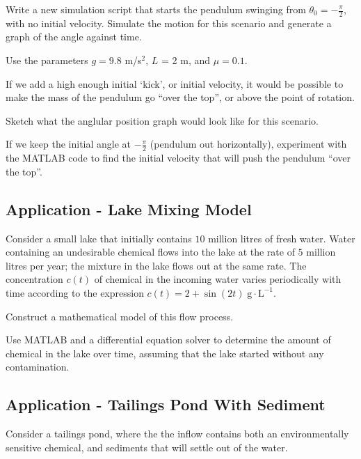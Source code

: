 \problem Write a new simulation script that starts the pendulum
swinging from $ \theta_0 = -\frac{\pi}{2}$, with no initial velocity.
Simulate the motion for this scenario and generate a graph of the
angle against time.

Use the  parameters $g = 9.8$ m/s$^2$, $L$ = 2 m, and $\mu = 0.1$. \\

\vsc

\newpage

If we add a high enough initial `kick', or initial velocity, it would
be possible to make the mass of the pendulum go ``over the top'', or
above the point of rotation.

\problem Sketch what the anglular position graph would look like for
this scenario.

\newpage

\problem If we keep the initial angle at $-\frac{\pi}{2}$ (pendulum
out horizontally), experiment with the MATLAB code to find the initial
velocity that will push the pendulum ``over the top''.

\newpage

\subsection{Application - Lake Mixing Model}
Consider a small lake that initially contains $10$ million litres of
fresh water.  Water containing an undesirable chemical flows into the
lake at the rate of $5$ million litres per year; the mixture in the
lake flows out at the same rate.  The concentration $c(t)$ of chemical
in the incoming water varies periodically with time according to the
expression $c(t) = 2 + \sin(2t) \; \text{g} \cdot \text{L}^{-1}$.

  \problem Construct a mathematical model of this flow process.

\newpage
\problem Use MATLAB and a differential equation solver to determine
the amount of chemical in the lake over time, assuming that the lake
started without any contamination.

\newpage

\subsection*{Application - Tailings Pond With Sediment}
Consider a tailings pond, where the the inflow contains both an
environmentally sensitive chemical, and sediments that will settle out
of the water.


